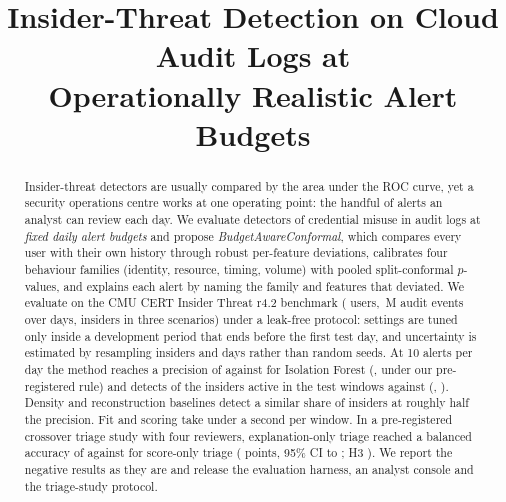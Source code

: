 \documentclass[conference]{IEEEtran}
\begin{document}
\title{Insider-Threat Detection on Cloud Audit Logs at\\Operationally Realistic Alert Budgets}

\author{\IEEEauthorblockN{[Author 1], [Author 2], [Author 3], [Author 4]}
}

\maketitle

\begin{abstract}
Insider-threat detectors are usually compared by the area under the ROC curve, yet a security
operations centre works at one operating point: the handful of alerts an analyst can review each
day. We evaluate detectors of credential misuse in audit logs at \emph{fixed daily alert budgets}
and propose \emph{BudgetAwareConformal}, which compares every user with their own history through
robust per-feature deviations, calibrates four behaviour families (identity, resource, timing,
volume) with pooled split-conformal $p$-values, and explains each alert by naming the family and
features that deviated. We evaluate on the CMU CERT Insider Threat r4.2 benchmark (\NUsers{} users,
\NEvents{}\,M audit events over \NDays{} days, \NInsiders{} insiders in three scenarios) under a
leak-free protocol: settings are tuned only inside a development period that ends before the first
test day, and uncertainty is estimated by resampling insiders and days rather than random seeds.
At 10 alerts per day the method reaches a precision of \POursBA{} against \PIFBA{} for Isolation
Forest (\HypOneBDiff{}, \HypOneBVerdict{} under our pre-registered rule) and detects \DROursBA{} of
the insiders active in the test windows against \DRIFBA{} (\HypOneADiff{}, \HypOneAVerdict{}).
Density and reconstruction baselines detect a similar share of insiders at roughly half the
precision. Fit and scoring take under a second per window. In a pre-registered crossover triage
study with four reviewers, explanation-only triage reached a balanced accuracy of \TriageBAB{}
against \TriageBAA{} for score-only triage (\TriageDiff{} points, 95\% CI \TriageLo{} to
\TriageHi{}; H3 \TriageVerdict). We report the negative results as they are and release the
evaluation harness, an analyst console and the triage-study protocol.
\end{abstract}
\end{document}

